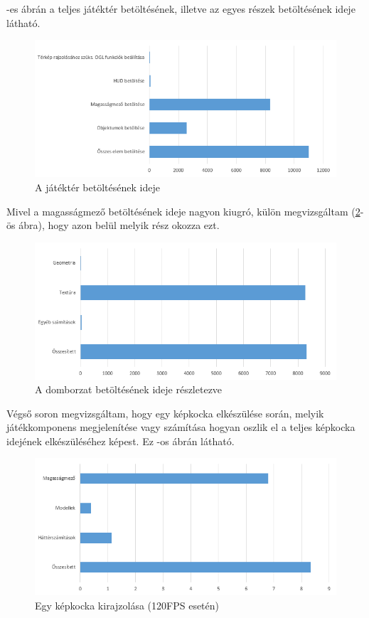 -es ábrán a teljes játéktér betöltésének, illetve az egyes részek betöltésének ideje látható.

\begin{figure}[h]
\centering
\includegraphics[scale=0.84]{kepek/map_load_diag.png}
\caption{A játéktér betöltésének ideje}
\label{fig:map_diag}
\end{figure}

Mivel a magasságmező betöltésének ideje nagyon kiugró, külön megvizsgáltam (\ref{fig:height_map_diag}-ös ábra), hogy azon belül melyik rész okozza ezt.
 
\begin{figure}[h]
\centering
\includegraphics[scale=0.84]{kepek/height_map_load_diag.png}
\caption{A domborzat betöltésének ideje részletezve}
\label{fig:height_map_diag}
\end{figure}

Végső soron megvizsgáltam, hogy egy képkocka elkészülése során, melyik játékkomponens megjelenítése vagy számítása hogyan oszlik el a teljes képkocka idejének elkészüléséhez képest. Ez -os ábrán látható.

\begin{figure}[h]
\centering
\includegraphics[scale=0.84]{kepek/frame_draw_diag.png}
\caption{Egy képkocka kirajzolása (120FPS esetén)}
\label{fig:frame_draw}
\end{figure}